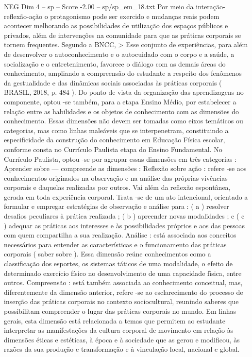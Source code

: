 \begin{textsample}{NEG Dim 4 – sp – Score -2.00 – sp/sp\_em\_18.txt}
Por meio da interação-reflexão-ação o protagonismo pode ser exercido e mudanças reais podem acontecer melhorando as possibilidades de utilização dos espaços públicos e privados, além de intervenções na comunidade para que as práticas corporais se tornem frequentes.
Segundo a BNCC, > Esse conjunto de experiências, para além de desenvolver o autoconhecimento e o autocuidado com o corpo e a saúde, a socialização e o entretenimento, favorece o diálogo com as demais áreas do conhecimento, ampliando a compreensão do estudante a respeito dos fenômenos da gestualidade e das dinâmicas sociais associadas às práticas corporais ( BRASIL, 2018, p. 484 ).
Do ponto de vista da organização das aprendizagens no componente, optou -se também, para a etapa Ensino Médio, por estabelecer a relação entre as habilidades e os objetos de conhecimento com as dimensões do conhecimento.
Essas dimensões não devem ser tomadas como eixos temáticos ou categorias, mas como linhas maleáveis que se interpenetram, constituindo a especificidade da construção do conhecimento em Educação Física escolar, conforme consta no Currículo Paulista etapa do Ensino Fundamental.
No Currículo Paulista, optou -se por agrupar essas dimensões em três categorias : Aprender sobre — compreende as dimensões : Reflexão sobre ação : refere -se aos conhecimentos originados na observação e na análise das próprias vivências corporais e daquelas realizadas por outros.
Vai além da reflexão espontânea, gerada em toda experiência corporal.
Trata -se de um ato intencional, orientado a formular e empregar estratégias de observação e análise para : ( a ) resolver desafios peculiares à prática realizada ; ( b ) apreender novas modalidades ; e ( c ) adequar as práticas aos interesses e às possibilidades próprios e aos das pessoas com quem compartilha a sua realização.
Análise : está associada aos conceitos necessários para entender as características e o funcionamento das práticas corporais ( saber sobre ).
Essa dimensão reúne conhecimentos como a classificação dos esportes, os sistemas táticos de uma modalidade, o efeito de determinado exercício físico no desenvolvimento de uma capacidade física, entre outros.
Compreensão : está também associada ao conhecimento conceitual, mas, diferentemente da dimensão anterior, refere -se ao esclarecimento do processo de inserção das práticas corporais no contexto sociocultural, reunindo saberes que possibilitam compreender o lugar das práticas corporais no mundo.
Em linhas gerais, esta dimensão está relacionada a temas que permitem ao estudante interpretar as manifestações da cultura corporal de movimento em relação às dimensões éticas e estéticas, à época e à sociedade que as gerou e modificou, às razões da sua produção e transformação e à vinculação local, nacional e global.

\end{textsample}
